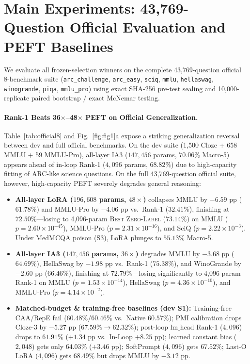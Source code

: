 \documentclass[10pt,twocolumn]{article}
\begin{document}
\section{Main Experiments: 43,769-Question Official Evaluation and PEFT Baselines}
\label{sec:main_exp}

We evaluate all frozen-selection winners on the complete 43,769-question official 8-benchmark suite (\texttt{arc\_challenge}, \texttt{arc\_easy}, \texttt{sciq}, \texttt{mmlu}, \texttt{hellaswag}, \texttt{winogrande}, \texttt{piqa}, \texttt{mmlu\_pro}) using exact SHA-256 pre-test sealing and 10,000-replicate paired bootstrap / exact McNemar testing.



\paragraph{Rank-1 Beats 36$\times$--48$\times$ PEFT on Official Generalization.}
Table~\ref{tab:official8} and Fig.~\ref{fig:fig1}a expose a striking generalization reversal between dev and full official benchmarks.
On the dev suite (1,500 Cloze + 658 MMLU + 59 MMLU-Pro), all-layer IA3 ($147{,}456$ params, $70.06\%$ Macro-5) appears ahead of in-loop Rank-1 ($4{,}096$ params, $68.82\%$) due to high-capacity fitting of ARC-like science questions.
On the full 43,769-question official suite, however, high-capacity PEFT severely degrades general reasoning:
\begin{itemize}
\item \textbf{All-layer LoRA ($196{,}608$ params, $48\times$)} collapses MMLU by $-6.59$ pp ($61.78\%$) and MMLU-Pro by $-4.06$ pp vs.\ Rank-1 ($32.41\%$), finishing at $72.50\%$---losing to 4,096-param \textsc{Best Zero-Label} ($73.14\%$) on MMLU ($p=2.60\times 10^{-45}$), MMLU-Pro ($p=2.31\times 10^{-16}$), and SciQ ($p=2.22\times 10^{-3}$). Under MedMCQA poison (S3), LoRA plunges to $55.13\%$ Macro-5.
\item \textbf{All-layer IA3 ($147{,}456$ params, $36\times$)} degrades MMLU by $-3.68$ pp ($64.69\%$), HellaSwag by $-1.98$ pp vs.\ Rank-1 ($75.38\%$), and WinoGrande by $-2.60$ pp ($66.46\%$), finishing at $72.79\%$---losing significantly to 4,096-param Rank-1 on MMLU ($p=1.53\times 10^{-14}$), HellaSwag ($p=4.36\times 10^{-10}$), and MMLU-Pro ($p=4.14\times 10^{-2}$).
\item \textbf{Matched-budget \& training-free baselines (dev S1):} Training-free CAA/RepE fail ($60.48\%$/$60.46\%$ vs.\ Native $60.57\%$); PMI calibration drops Cloze-3 by $-5.27$ pp ($67.59\%\to 62.32\%$); post-loop $\mathrm{lm\_head}$ Rank-1 ($4{,}096$) drops to $61.91\%$ ($+1.34$ pp vs.\ In-Loop $+8.25$ pp); learned constant bias ($2{,}048$) gets only $64.03\%$ ($+3.46$ pp); SoftPrompt ($4{,}096$) gets $67.52\%$; Last-O LoRA ($4{,}096$) gets $68.49\%$ but drops MMLU by $-3.12$ pp.
\end{itemize}
\end{document}

